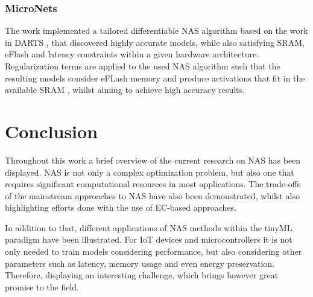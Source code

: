 \documentclass[10pt,        %
               a4paper,     %
               journal,     %
               ]{IEEEtran}
\begin{document}
\subsubsection{\textbf{MicroNets}}
The work \cite{banbury2021micronets} implemented a tailored differentiable NAS algorithm based on the work in DARTS
\cite{liu2018darts}, that discovered highly accurate models, while also satisfying SRAM, eFlash and latency constraints
within a given hardware architecture. Regularization terms are applied to the used NAS algorithm such that the resulting
models consider eFLash memory and produce activations that fit in the available SRAM \cite{banbury2021micronets}, whilst
aiming to achieve high accuracy results.

\section{Conclusion}
Throughout this work a brief overview of the current research on NAS has been displayed. NAS is not only
a complex optimization problem, but also one that requires significant computational resources in most applications. The
trade-offs of the mainstream approaches to NAS have also been demonstrated, whilst also highlighting efforts done with the
use of EC-based approaches.

In addition to that, different applications of NAS methods within the tinyML paradigm have been illustrated.
For IoT devices and microcontrollers it is not only needed to train models considering performance,
but also considering other parameters such as latency, memory usage and even energy preservation. Therefore, displaying
an interesting challenge, which brings however great promise to the field.




%
\end{document}
